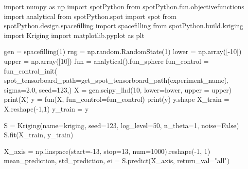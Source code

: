 \documentclass[
  letterpaper,
  DIV=11,
  numbers=noendperiod]{scrreprt}
\newenvironment{Shaded}{\begin{snugshade}}{\end{snugshade}}
\newcommand{\BuiltInTok}[1]{\textcolor[rgb]{0.00,0.23,0.31}{#1}}
\newcommand{\DecValTok}[1]{\textcolor[rgb]{0.68,0.00,0.00}{#1}}
\newcommand{\FloatTok}[1]{\textcolor[rgb]{0.68,0.00,0.00}{#1}}
\newcommand{\ImportTok}[1]{\textcolor[rgb]{0.00,0.46,0.62}{#1}}
\newcommand{\NormalTok}[1]{\textcolor[rgb]{0.00,0.23,0.31}{#1}}
\newcommand{\OperatorTok}[1]{\textcolor[rgb]{0.37,0.37,0.37}{#1}}
\newcommand{\StringTok}[1]{\textcolor[rgb]{0.13,0.47,0.30}{#1}}
\newcommand{\VariableTok}[1]{\textcolor[rgb]{0.07,0.07,0.07}{#1}}
\begin{document}
\begin{Shaded}
\begin{Highlighting}[]
\ImportTok{import}\NormalTok{ numpy }\ImportTok{as}\NormalTok{ np}
\ImportTok{import}\NormalTok{ spotPython}
\ImportTok{from}\NormalTok{ spotPython.fun.objectivefunctions }\ImportTok{import}\NormalTok{ analytical}
\ImportTok{from}\NormalTok{ spotPython.spot }\ImportTok{import}\NormalTok{ spot}
\ImportTok{from}\NormalTok{ spotPython.design.spacefilling }\ImportTok{import}\NormalTok{ spacefilling}
\ImportTok{from}\NormalTok{ spotPython.build.kriging }\ImportTok{import}\NormalTok{ Kriging}
\ImportTok{import}\NormalTok{ matplotlib.pyplot }\ImportTok{as}\NormalTok{ plt}

\NormalTok{gen }\OperatorTok{=}\NormalTok{ spacefilling(}\DecValTok{1}\NormalTok{)}
\NormalTok{rng }\OperatorTok{=}\NormalTok{ np.random.RandomState(}\DecValTok{1}\NormalTok{)}
\NormalTok{lower }\OperatorTok{=}\NormalTok{ np.array([}\OperatorTok{{-}}\DecValTok{10}\NormalTok{])}
\NormalTok{upper }\OperatorTok{=}\NormalTok{ np.array([}\DecValTok{10}\NormalTok{])}
\NormalTok{fun }\OperatorTok{=}\NormalTok{ analytical().fun\_sphere}
\NormalTok{fun\_control }\OperatorTok{=}\NormalTok{ fun\_control\_init(}
\NormalTok{    spot\_tensorboard\_path}\OperatorTok{=}\NormalTok{get\_spot\_tensorboard\_path(experiment\_name),}
\NormalTok{    sigma}\OperatorTok{=}\FloatTok{2.0}\NormalTok{,}
\NormalTok{    seed}\OperatorTok{=}\DecValTok{123}\NormalTok{,)}
\NormalTok{X }\OperatorTok{=}\NormalTok{ gen.scipy\_lhd(}\DecValTok{10}\NormalTok{, lower}\OperatorTok{=}\NormalTok{lower, upper }\OperatorTok{=}\NormalTok{ upper)}
\BuiltInTok{print}\NormalTok{(X)}
\NormalTok{y }\OperatorTok{=}\NormalTok{ fun(X, fun\_control}\OperatorTok{=}\NormalTok{fun\_control)}
\BuiltInTok{print}\NormalTok{(y)}
\NormalTok{y.shape}
\NormalTok{X\_train }\OperatorTok{=}\NormalTok{ X.reshape(}\OperatorTok{{-}}\DecValTok{1}\NormalTok{,}\DecValTok{1}\NormalTok{)}
\NormalTok{y\_train }\OperatorTok{=}\NormalTok{ y}

\NormalTok{S }\OperatorTok{=}\NormalTok{ Kriging(name}\OperatorTok{=}\StringTok{\textquotesingle{}kriging\textquotesingle{}}\NormalTok{,}
\NormalTok{            seed}\OperatorTok{=}\DecValTok{123}\NormalTok{,}
\NormalTok{            log\_level}\OperatorTok{=}\DecValTok{50}\NormalTok{,}
\NormalTok{            n\_theta}\OperatorTok{=}\DecValTok{1}\NormalTok{,}
\NormalTok{            noise}\OperatorTok{=}\VariableTok{False}\NormalTok{)}
\NormalTok{S.fit(X\_train, y\_train)}

\NormalTok{X\_axis }\OperatorTok{=}\NormalTok{ np.linspace(start}\OperatorTok{={-}}\DecValTok{13}\NormalTok{, stop}\OperatorTok{=}\DecValTok{13}\NormalTok{, num}\OperatorTok{=}\DecValTok{1000}\NormalTok{).reshape(}\OperatorTok{{-}}\DecValTok{1}\NormalTok{, }\DecValTok{1}\NormalTok{)}
\NormalTok{mean\_prediction, std\_prediction, ei }\OperatorTok{=}\NormalTok{ S.predict(X\_axis, return\_val}\OperatorTok{=}\StringTok{"all"}\NormalTok{)}


\end{Highlighting}
\end{Shaded}
\end{document}
